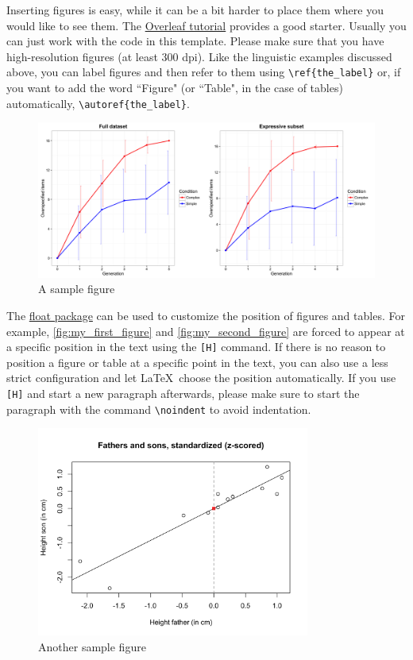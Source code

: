 Inserting figures is easy, while it can be a bit harder to place them where you would like to see them. The \href{https://www.overleaf.com/learn/latex/Inserting_Images}{Overleaf tutorial} provides a good starter. Usually you can just work with the code in this template. Please make sure that you have high-resolution figures (at least 300 dpi). Like the linguistic examples discussed above, you can label figures and then refer to them using \verb!\ref{the_label}! or, if you want to add the word ``Figure" (or ``Table", in the case of tables) automatically, \verb!\autoref{the_label}!.


\begin{figure}[H]
    \centering
    \includegraphics[width=\textwidth]{Figures/Figure2.png}
    \caption{A sample figure}
    \label{fig:my_first_figure}
\end{figure}

\noindent The \href{https://ftp.tu-chemnitz.de/pub/tex/macros/latex/contrib/float/float.pdf}{float package} can be used to customize the position of figures and tables. For example, \autoref{fig:my_first_figure} and \autoref{fig:my_second_figure} are forced to appear at a specific position in the text using the \verb![H]! command. If there is no reason to position a figure or table at a specific point in the text, you can also use a less strict configuration and let \LaTeX \  choose the position automatically. If you use \verb![H]! and start a new paragraph afterwards, please make sure to start the paragraph with the command \verb!\noindent! to avoid indentation.

\begin{figure}[H]
    \centering
    \includegraphics[width=0.8\textwidth]{Figures/fathersandsons4.png}
    \caption{Another sample figure}
    \label{fig:my_second_figure}
\end{figure}

